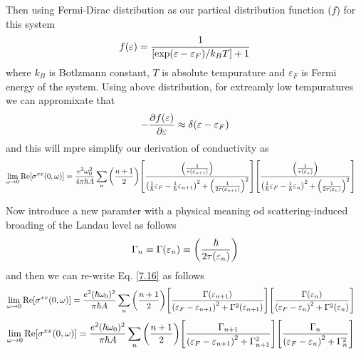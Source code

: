 \noindent
Then using Fermi-Dirac distribution as our partical distribution function ($f$) for this system
\begin{equation} \label{7.14}
  f(\varepsilon) = \frac{1}{\qty[\exp(\varepsilon - \varepsilon_F)/k_B T]+1}
\end{equation}
where $k_B$ is Botlzmann constant, $T$ is absolute tempurature and $\varepsilon_F$ is Fermi energy of the system. Using above distribution, for extreamly low tempuratures we can appromixate that
\begin{equation} \label{7.15}
  - \pdv{f(\varepsilon)}{\varepsilon} \approx \delta(\varepsilon - \varepsilon_F)
\end{equation}
and this will mpre simplify our derivation of conductivity as
\begin{equation} \label{7.16}
  \begin{aligned}
    \lim_{\omega \to 0}
    \text{Re}[{\sigma}^{xx}(0,\omega)] & =
    \frac{e^2 \omega_0^2}{4\pi\hbar A}
    \sum_{n}
    \qty(\frac{n+1}{2})
    \qty[
    \frac{\qty(\frac{1}{\tau(\varepsilon_{n+1})})
    }
    {
    \qty(
    \frac{1}{\hbar}\varepsilon_F -
    \frac{1}{\hbar}\varepsilon_{n+1}
    )^2
    + \qty(\frac{1}{2\tau(\varepsilon_{n+1})})^2
    }]
    \qty[
    \frac{\qty(\frac{1}{\tau(\varepsilon_{n})})
    }
    {
    \qty(
    \frac{1}{\hbar}\varepsilon_F -
    \frac{1}{\hbar}\varepsilon_{n}
    )^2
    + \qty(\frac{1}{2\tau(\varepsilon_{n})})^2
    }]
  \end{aligned}
\end{equation}

\noindent
Now introduce a new paramter with a physical meaning od scattering-induced broading of the Landau level as follows
\begin{equation} \label{6.17}
  \Gamma_n \equiv\Gamma(\varepsilon_n) \equiv \qty(\frac{\hbar }{2\tau(\varepsilon_n)})
\end{equation}
and then we can re-write Eq. \eqref{7.16} as follows
\begin{equation} \label{7.18}
  \begin{aligned}
    \lim_{\omega \to 0}
    \text{Re}[{\sigma}^{xx}(0,\omega)] & =
    \frac{e^2 (\hbar\omega_0)^2}{\pi\hbar A}
    \sum_{n}
    \qty(\frac{n+1}{2})
    \qty[
    \frac{\Gamma(\varepsilon_{n+1})
    }
    {
    \qty(
    \varepsilon_F - \varepsilon_{n+1}
    )^2
    + \Gamma^2(\varepsilon_{n+1})
    }]
    \qty[
    \frac{\Gamma(\varepsilon_{n})
    }
    {
    \qty(
    \varepsilon_F - \varepsilon_{n}
    )^2
    + \Gamma^2(\varepsilon_{n})
    }]
  \end{aligned}
\end{equation}
\begin{equation} \label{7.19}
  \begin{aligned}
    \lim_{\omega \to 0}
    \text{Re}[{\sigma}^{xx}(0,\omega)] & =
    \frac{e^2 (\hbar\omega_0)^2}{\pi\hbar A}
    \sum_{n}
    \qty(\frac{n+1}{2})
    \qty[
    \frac{\Gamma_{n+1}
    }
    {
    \qty(
    \varepsilon_F - \varepsilon_{n+1}
    )^2
    + \Gamma^2_{n+1}
    }]
    \qty[
    \frac{\Gamma_{n}
    }
    {
    \qty(
    \varepsilon_F - \varepsilon_{n}
    )^2
    + \Gamma^2_{n}
    }]
  \end{aligned}
\end{equation}

